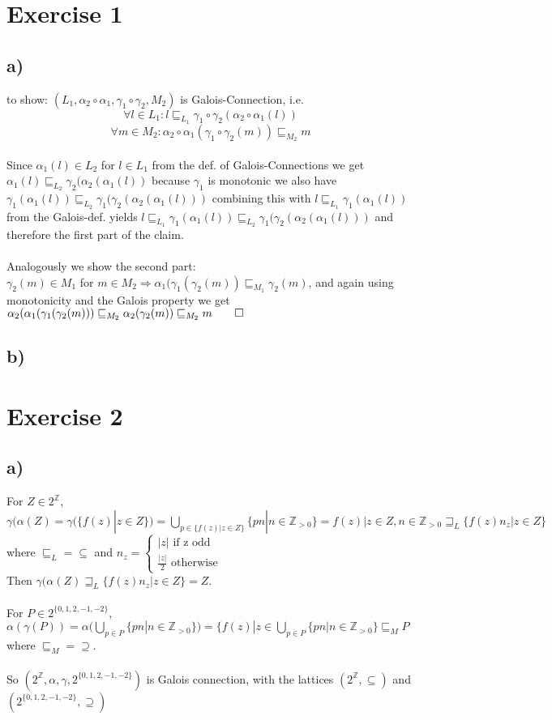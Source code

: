 \documentclass[fleqn,12pt]{article}
\begin{document}
\section*{Exercise 1}
\subsection*{a)}
to show: $(L_1, \alpha_2 \circ \alpha_1, \gamma_1 \circ \gamma_2, M_2)$ is Galois-Connection, i.e.
$$\forall l \in L_1 : l \sqsubseteq_{L_1} \gamma_1 \circ \gamma_2 (\alpha_2 \circ \alpha_1 (l))$$
$$\forall m \in M_2 : \alpha_2 \circ \alpha_1(\gamma_1 \circ \gamma_2  (m)) \sqsubseteq_{M_2} m$$\\
Since $\alpha_1(l) \in L_2$ for $l \in L_1$ from the def. of Galois-Connections we get $\alpha_1(l) \sqsubseteq_{L_2} \gamma_2(\alpha_2(\alpha_1(l))$ because $\gamma_1$ is monotonic we also have $\gamma_1(\alpha_1(l)) \sqsubseteq_{L_2} \gamma_1(\gamma_2(\alpha_2(\alpha_1(l)))$ combining this with $l \sqsubseteq_{L_1} \gamma_1(\alpha_1(l))$ from the Galois-def. yields $l \sqsubseteq_{L_1} \gamma_1(\alpha_1(l)) \sqsubseteq_{L_2} \gamma_1(\gamma_2(\alpha_2(\alpha_1(l)))$ and therefore the first part of the claim.\\
\\
Analogously we show the second part:\\
$\gamma_2(m)\in M_1$ for $m\in M_2 \Rightarrow \alpha_1(\gamma_1(\gamma_2(m)) \sqsubseteq_{M_1} \gamma_2(m)$, and  again using monotonicity and the Galois property we get $\alpha_2(\alpha_1(\gamma_1(\gamma_2(m))) \sqsubseteq_{M_2} \alpha_2(\gamma_2(m)) \sqsubseteq_{M_2} m \qed$
\subsection*{b)}

\section*{Exercise 2}
\subsection*{a)}
For $Z \in 2^\mathbb{Z}$, $\gamma(\alpha(Z) = \gamma(\{ f(z) | z \in Z \}) = \bigcup_{p\in \{ f(z) | z \in Z \}} \{p n | n \in \mathbb{Z}_{>0}\} = {f(z) | z \in Z, n \in \mathbb{Z}_{>0}} \sqsupseteq_L \{f(z) n_z | z \in Z\} $ where $\sqsubseteq_L = \subseteq$ and
$n_z = 
	\begin{cases}
	|z| \text{ if z odd}\\
	\frac{|z|}{2} \text{ otherwise}	
	\end{cases}$\\
Then $\gamma(\alpha(Z) \sqsupseteq_L \{f(z) n_z | z \in Z\} = Z$.\\
\\
For $P \in 2^{\{0,1,2,-1,-2\}}$, $\alpha(\gamma(P)) = \alpha(\bigcup_{p\in P} \{p n | n \in \mathbb{Z}_{>0}\}) = \{f(z) | z \in \bigcup_{p\in P} \{p n | n \in \mathbb{Z}_{>0}\} \sqsubseteq_M P $ where $\sqsubseteq_M = \supseteq$.\\
\\
So $(2^\mathbb{Z},\alpha,\gamma,2^{\{0,1,2,-1,-2\}})$ is Galois connection, with the lattices $(2^\mathbb{Z},\subseteq)$ and $(2^{\{0,1,2,-1,-2\}},\supseteq)$
\end{document}
